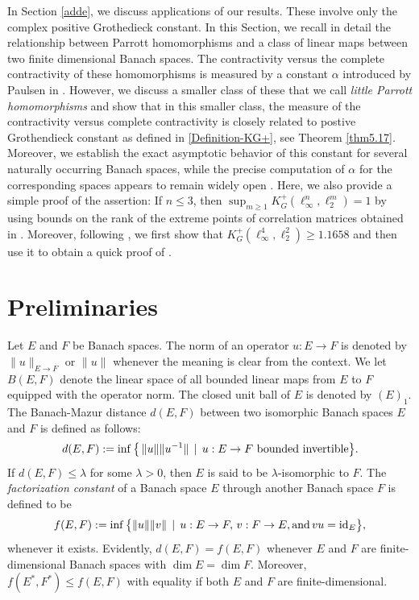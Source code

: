 \documentclass[a4paper,oneside,11pt, reqno]{amsart}
\numberwithin{equation}{section}
\theoremstyle{plain}
\begin{document}
In Section \ref{adde}, we discuss applications of our results. These involve only the complex positive Grothedieck constant. In this Section, we recall in detail the relationship between Parrott homomorphisms and a class of linear maps between two finite dimensional Banach spaces. The contractivity versus the complete contractivity of these homomorphisms is measured by a constant $\alpha$ introduced by Paulsen in \cite{vip}. However, we discuss a smaller class of these that we call \textit{little Parrott homomorphisms} and show that in this smaller class, the measure of the contractivity versus complete contractivity is closely related to postive Grothendieck constant as defined in \eqref{Definition-KG+}, see Theorem \ref{thm5.17}. Moreover, we establish the exact asymptotic behavior of this constant for several naturally occurring Banach spaces, while the precise computation of \( \alpha \) for the corresponding spaces appears to remain widely open \cite{vip}. Here, we also provide a simple proof of the assertion: If $n\leqslant 3$, then $\sup_{m\geqslant 1}K_G^{+}(\ell_\infty^n,\ell_2^m)=1$ by  using bounds on the rank of the extreme points of correlation matrices  obtained  in \cite{LCB}. Moreover, following \cite{AFHS95}, we first show that $K_G^{+}(\ell_\infty^4,\ell_2^2)\geqslant 1.1658$ and then use it to  obtain a  quick proof of \cite[Theorem 2.1]{Davidchoi}.

 

\section{Preliminaries}\label{prel} 
Let $E$ and $F$ be Banach spaces. The norm of an operator $u:E\to F$ is denoted by $\|u\|_{E\to F}$ or $\|u\|$ whenever the meaning is clear from the context. We let $B(E,F)$ denote the linear space of all bounded linear maps from $E$ to $F$ equipped with the operator norm. The closed unit ball of $E$ is denoted by $(E)_1$. The Banach-Mazur distance $d(E,F)$ between two isomorphic Banach spaces $E$ and $F$ is defined as follows:
\begin{eqnarray*}
d(E,F):=\inf\big \{\,\|u\| \|u^{-1}\| \,\mid\, u:E\to F\,\, \mbox{\rm bounded invertible}\big \}.
\end{eqnarray*}
 If $d(E,F)\leqslant \lambda$ for some $\lambda>0$, then $E$ is said to be $\lambda$-isomorphic to $F$. 
The {\it factorization constant} of a Banach space $E$ through another Banach space $F$ is defined to be 
\begin{eqnarray*}
f(E,F):=\inf \big \{ \|u\| \|v\|\, \mid \,  u:E\to F,\, v:F\to E, \mbox{\rm and}\,v u= \mbox{\rm id}_E \big \},
\end{eqnarray*}
whenever it exists.
Evidently, $d(E,F)=f(E,F)$ whenever $E$ and $F$ are finite-dimensional Banach spaces with $\dim E=\dim F.$ Moreover, $f(E^*,F^*)\leqslant f(E,F)$ with equality if both $E$ and $F$ are finite-dimensional.
\end{document}
